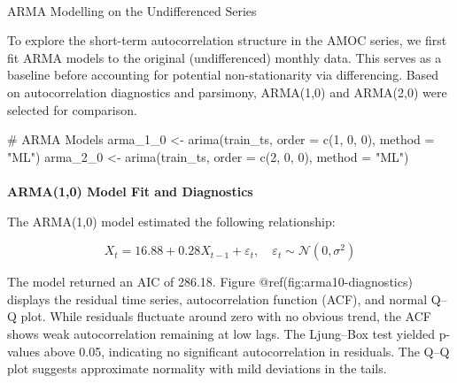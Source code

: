 \documentclass[
  11pt,
]{article}
\makeatletter
\let\oldparagraph\paragraph
\renewcommand{\paragraph}{
    \@ifstar
      \xxxParagraphStar
      \xxxParagraphNoStar
  }
\newcommand{\xxxParagraphStar}[1]{\oldparagraph*{#1}\mbox{}}
\newcommand{\xxxParagraphNoStar}[1]{\oldparagraph{#1}\mbox{}}
\newenvironment{Shaded}{\begin{snugshade}}{\end{snugshade}}
\newcommand{\AttributeTok}[1]{\textcolor[rgb]{0.40,0.45,0.13}{#1}}
\newcommand{\CommentTok}[1]{\textcolor[rgb]{0.37,0.37,0.37}{#1}}
\newcommand{\DecValTok}[1]{\textcolor[rgb]{0.68,0.00,0.00}{#1}}
\newcommand{\FunctionTok}[1]{\textcolor[rgb]{0.28,0.35,0.67}{#1}}
\newcommand{\NormalTok}[1]{\textcolor[rgb]{0.00,0.23,0.31}{#1}}
\newcommand{\OtherTok}[1]{\textcolor[rgb]{0.00,0.23,0.31}{#1}}
\newcommand{\StringTok}[1]{\textcolor[rgb]{0.13,0.47,0.30}{#1}}
\makeatother
\begin{document}
\paragraph{ARMA Modelling on the Undifferenced
Series}\label{arma-modelling-on-the-undifferenced-series}

To explore the short-term autocorrelation structure in the AMOC series,
we first fit ARMA models to the original (undifferenced) monthly data.
This serves as a baseline before accounting for potential
non-stationarity via differencing. Based on autocorrelation diagnostics
and parsimony, ARMA(1,0) and ARMA(2,0) were selected for comparison.

\begin{Shaded}
\begin{Highlighting}[]
\CommentTok{\# ARMA Models}
\NormalTok{arma\_1\_0 }\OtherTok{\textless{}{-}} \FunctionTok{arima}\NormalTok{(train\_ts, }\AttributeTok{order =} \FunctionTok{c}\NormalTok{(}\DecValTok{1}\NormalTok{, }\DecValTok{0}\NormalTok{, }\DecValTok{0}\NormalTok{), }\AttributeTok{method =} \StringTok{"ML"}\NormalTok{)}
\NormalTok{arma\_2\_0 }\OtherTok{\textless{}{-}} \FunctionTok{arima}\NormalTok{(train\_ts, }\AttributeTok{order =} \FunctionTok{c}\NormalTok{(}\DecValTok{2}\NormalTok{, }\DecValTok{0}\NormalTok{, }\DecValTok{0}\NormalTok{), }\AttributeTok{method =} \StringTok{"ML"}\NormalTok{)}
\end{Highlighting}
\end{Shaded}

\paragraph{\texorpdfstring{\textbf{ARMA(1,0) Model Fit and
Diagnostics}}{ARMA(1,0) Model Fit and Diagnostics}}\label{arma10-model-fit-and-diagnostics}

The ARMA(1,0) model estimated the following relationship:

\[
X_t = 16.88 + 0.28 X_{t-1} + \varepsilon_t, \quad \varepsilon_t \sim \mathcal{N}(0, \sigma^2)
\]

The model returned an AIC of 286.18. Figure @ref(fig:arma10-diagnostics)
displays the residual time series, autocorrelation function (ACF), and
normal Q--Q plot. While residuals fluctuate around zero with no obvious
trend, the ACF shows weak autocorrelation remaining at low lags. The
Ljung--Box test yielded p-values above 0.05, indicating no significant
autocorrelation in residuals. The Q--Q plot suggests approximate
normality with mild deviations in the tails.
\end{document}
